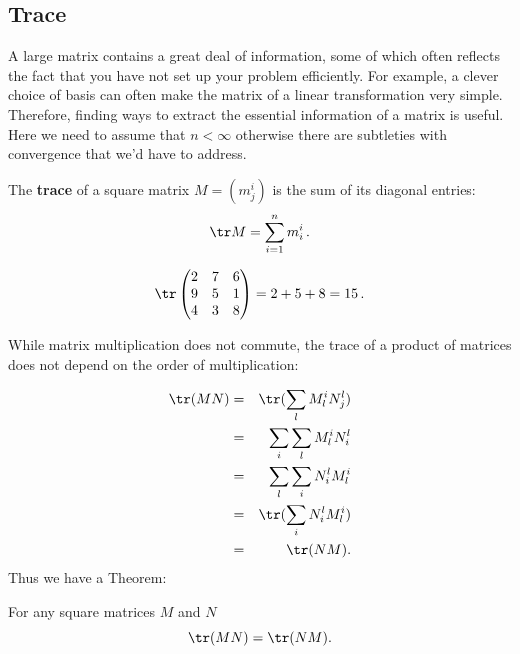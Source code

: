 \subsection{Trace}

A large matrix contains a great deal of information, some of which often reflects the fact that you have not set up your problem efficiently. For example, a clever choice of basis can often make the matrix of a linear transformation very simple. Therefore, finding ways to extract the essential information of a matrix is useful. Here we need to assume that $n < \infty$ otherwise there are subtleties with convergence that we'd have to address.

\begin{definition}
The \hypertarget{TRACE}{{\bfseries trace}} of a square matrix $M=(m_j^i)$ is the sum of its diagonal entries:
\[
\tr M = \sum_{i=1}^{n}m_i^i\, .
\]
\end{definition}

\begin{example}
\[
\tr \begin{pmatrix}
2 & 7 & 6\\
9 & 5 & 1\\
4 & 3 & 8\\
\end{pmatrix} = 2+5+8 = 15\, .
\]
\end{example}
While matrix multiplication does not commute, the trace of a product of matrices does not depend on the order of multiplication:

\begin{eqnarray*}
\tr(MN) & = & \tr( \sum_l M_l^i N_j^l ) \\
& = & \sum_i \sum_l M_l^i N_i^l \\
& = & \sum_l \sum_i N_i^l M_l^i \\
& = & \tr( \sum_i N_i^l M_l^i ) \\
& = & \tr( NM ).
\end{eqnarray*}
Thus we have a Theorem:
\begin{theorem} For any square matrices $M$ and $N$ \[\tr(MN)=\tr(NM).\]
\end{theorem}

